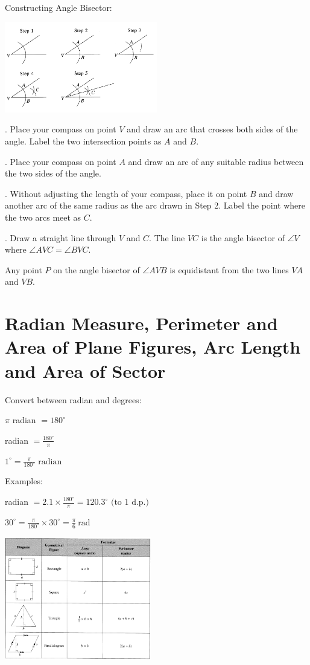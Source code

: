 \documentclass[twocolumn]{article}
\begin{document}
\noindent
Constructing Angle Bisector:

\includegraphics[width=0.5\textwidth]{55.png}

. Place your compass on point $V$ and draw an arc that crosses both sides of the angle. Label the two intersection points as $A$ and $B$.

. Place your compass on point $A$ and draw an arc of any suitable radius between the two sides of the angle.

. Without adjusting the length of your compass, place it on point $B$ and draw another arc of the same radius as the arc drawn in Step 2. Label the point where the two arcs meet as $C$.

. Draw a straight line through $V$ and $C$. The line $V C$ is the angle bisector of $\angle V$ where $\angle A V C=\angle B V C$.

\noindent
Any point $P$ on the angle bisector of $\angle A V B$ is equidistant from the two lines $VA$ and $VB$.



\section*{Radian Measure, Perimeter and Area of Plane Figures, Arc Length and Area of Sector}

\noindent
Convert between radian and degrees:

\noindent
$\pi$ radian $=180^{\circ}$

 radian $=\frac{180^{\circ}}{\pi}$

\noindent 
$
1^{\circ}=\frac{\pi}{180^{\circ}} \text { radian }
$

\noindent
Examples: 

 radian $=2.1 \times \frac{180^{\circ}}{\pi} =120.3^{\circ} \text { (to } 1 \text { d.p.) } $

\noindent
$30^{\circ}=\frac{\pi}{180^{\circ}} \times 30^{\circ} =\frac{\pi}{6} \ \mathrm{rad}$

\includegraphics[width=0.48\textwidth]{80.png}
\end{document}
